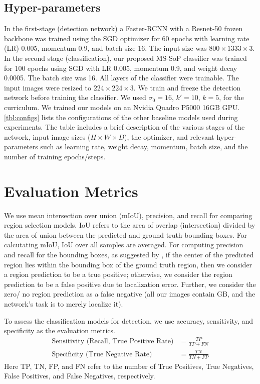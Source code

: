 \subsection{Hyper-parameters}
%
In the first-stage (\roi detection network) a Faster-RCNN \cite{fasterrcnn} with a Resnet-50 frozen backbone was trained using the SGD optimizer for 60 epochs with learning rate (LR) 0.005, momentum 0.9, and batch size 16. The input size was $800 \times 1333 \times 3$. In the second stage (classification), our proposed 
MS-SoP classifier was trained for 100 epochs using SGD with LR 0.005, momentum 0.9, and weight decay 0.0005. The batch size was 16. All layers of the classifier were trainable. The input images were resized to $224\times224\times3$. We train and freeze the \roi detection network before training the classifier. We used $\sigma_0\!=\!16$, $k'\!=\!10$, $k\!=\!5$, for the curriculum. We trained our models on an Nvidia Quadro P5000 16GB GPU. \cref{tbl:configs} lists the configurations of the other baseline models used during experiments. The table includes a brief description of the various stages of the network, input image sizes ($H\times W\times D$), the optimizer, and relevant hyper-parameters such as learning rate, weight decay, momentum, batch size, and the number of training epochs/steps. 


\section{Evaluation Metrics}
\label{sec:eval_metric}
%
%
We use mean intersection over union (mIoU), precision, and recall for comparing region selection models. IoU refers to the area of overlap (intersection) divided by the area of union between the predicted and ground truth bounding boxes. For calcutating mIoU, IoU over all samples are averaged. 
For computing precision and recall for the bounding boxes, as suggested by \cite{ribli2018detecting}, if the center of the predicted region lies within the bounding box of the ground truth region, then we consider a region prediction to be a true positive; otherwise, we consider the region prediction to be a false positive due to localization error. Further, we consider the zero/ no region prediction as a false negative (all our images contain GB, and the network's task is to merely localize it). 

%
To assess the classification models for \gbc detection, we use accuracy, sensitivity, and specificity as the evaluation metrics. 
\begin{align*}
    \text{Sensitivity (Recall, True Positive Rate)} &= \frac{TP}{TP+FN} \\
    \text{Specificity (True Negative Rate)} &= \frac{TN}{TN+FP} %
\end{align*}
Here TP, TN, FP, and FN refer to the number of True Positives, True Negatives, False Positives, and False Negatives, respectively.

